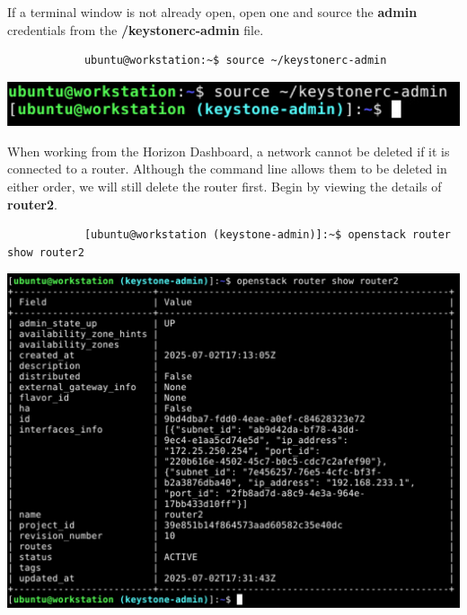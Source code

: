 \documentclass[letterpaper, 12pt]{article}
\begin{document}
\begin{enumerate}
    \begin{labstep}
        If a terminal window is not already open, open one and source the \textbf{admin} credentials from the
        \textbf{\texttildemid/keystonerc-admin} file.
        \begin{lstlisting}
            ubuntu@workstation:~$ source ~/keystonerc-admin
        \end{lstlisting}

        \begin{center}
            \includegraphics[width=\linewidth]{images/part4/step1.png}
        \end{center}
    \end{labstep}

    \begin{labstep}
        When working from the Horizon Dashboard, a network cannot be deleted if it is connected to a router.
        Although the command line allows them to be deleted in either order, we will still delete the router first.
        Begin by viewing the details of \textbf{router2}.
        \begin{lstlisting}
            [ubuntu@workstation (keystone-admin)]:~$ openstack router show router2
        \end{lstlisting}

        \begin{center}
            \includegraphics[width=\linewidth]{images/part4/step2.png}
        \end{center}
    \end{labstep}


\end{enumerate}
\end{document}
